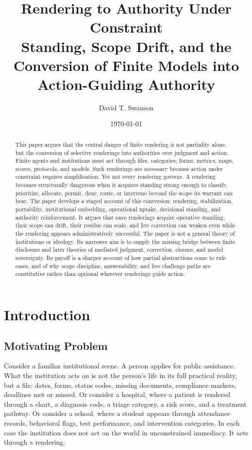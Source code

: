 \documentclass[11pt]{article}
\title{\textbf{Rendering to Authority Under Constraint}\\
\large Standing, Scope Drift, and the Conversion of Finite Models into Action-Guiding Authority}
\author{David T. Swanson}
\date{\today}
\begin{document}
\maketitle

\begin{abstract}
This paper argues that the central danger of finite rendering is not partiality alone, but the conversion of selective renderings into authorities over judgment and action. Finite agents and institutions must act through files, categories, forms, metrics, maps, scores, protocols, and models. Such renderings are necessary because action under constraint requires simplification. Yet not every rendering governs. A rendering becomes structurally dangerous when it acquires standing strong enough to classify, prioritize, allocate, permit, deny, route, or intervene beyond the scope its warrant can bear. The paper develops a staged account of this conversion: rendering, stabilization, portability, institutional embedding, operational uptake, decisional standing, and authority reinforcement. It argues that once renderings acquire operative standing, their scope can drift, their residue can scale, and live correction can weaken even while the rendering appears administratively successful. The paper is not a general theory of institutions or ideology. Its narrower aim is to supply the missing bridge between finite disclosure and later theories of mediated judgment, correction, closure, and model sovereignty. Its payoff is a sharper account of how partial abstractions come to rule cases, and of why scope discipline, answerability, and live challenge paths are constitutive rather than optional wherever renderings guide action.
\end{abstract}
\pagebreak
\section{Introduction}

\subsection{Motivating Problem}

Consider a familiar institutional scene. A person applies for public assistance. What the institution acts on is not the person's life in its full practical reality, but a file: dates, forms, status codes, missing documents, compliance markers, deadlines met or missed. Or consider a hospital, where a patient is rendered through a chart, a diagnosis code, a triage category, a risk score, and a treatment pathway. Or consider a school, where a student appears through attendance records, behavioral flags, test performance, and intervention categories. In each case the institution does not act on the world in unconstrained immediacy. It acts through a rendering.\cite{Scott1998SeeingLikeState,BowkerStar1999SortingThingsOut,MoynihanHerdHarvey2015AdministrativeBurden,Eubanks2018AutomatingInequality}
\end{document}
